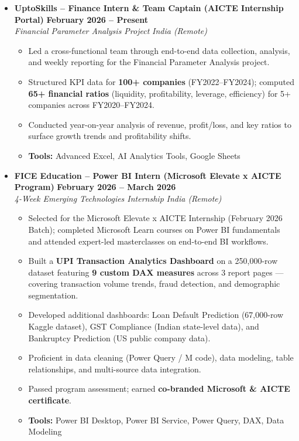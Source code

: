 \documentclass[9pt, letterpaper]{article}
\newcommand{\resumeItem}[1]{\item\small{#1}}
\newcommand{\resumeSubheading}[4]{
  \item[]
  \textbf{#1} \hfill \textbf{#2} \\
  \textit{#3} \hfill \textit{#4}
}
\begin{document}
\begin{itemize}[leftmargin=0em, label={}]

  \resumeSubheading
    {UptoSkills – Finance Intern \& Team Captain (AICTE Internship Portal)}{February 2026 – Present}
    {Financial Parameter Analysis Project}{India (Remote)}
  \begin{itemize}
    \resumeItem{Led a cross-functional team through end-to-end data collection, analysis, and weekly reporting for the Financial Parameter Analysis project.}
    \resumeItem{Structured KPI data for \textbf{100+ companies} (FY2022–FY2024); computed \textbf{65+ financial ratios} (liquidity, profitability, leverage, efficiency) for 5+ companies across FY2020–FY2024.}
    \resumeItem{Conducted year-on-year analysis of revenue, profit/loss, and key ratios to surface growth trends and profitability shifts.}
    \resumeItem{\textbf{Tools:} Advanced Excel, AI Analytics Tools, Google Sheets}
  \end{itemize}

  \vspace{2pt}

  \resumeSubheading
    {FICE Education – Power BI Intern (Microsoft Elevate x AICTE Program)}{February 2026 – March 2026}
    {4-Week Emerging Technologies Internship}{India (Remote)}
  \begin{itemize}
    \resumeItem{Selected for the Microsoft Elevate x AICTE Internship (February 2026 Batch); completed Microsoft Learn courses on Power BI fundamentals and attended expert-led masterclasses on end-to-end BI workflows.}
    \resumeItem{Built a \textbf{UPI Transaction Analytics Dashboard} on a 250,000-row dataset featuring \textbf{9 custom DAX measures} across 3 report pages — covering transaction volume trends, fraud detection, and demographic segmentation.}
    \resumeItem{Developed additional dashboards: Loan Default Prediction (67,000-row Kaggle dataset), GST Compliance (Indian state-level data), and Bankruptcy Prediction (US public company data).}
    \resumeItem{Proficient in data cleaning (Power Query / M code), data modeling, table relationships, and multi-source data integration.}
    \resumeItem{Passed program assessment; earned \textbf{co-branded Microsoft \& AICTE certificate}.}
    \resumeItem{\textbf{Tools:} Power BI Desktop, Power BI Service, Power Query, DAX, Data Modeling}
  \end{itemize}

  \vspace{2pt}


\end{itemize}
\end{document}
